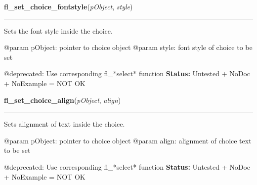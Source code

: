    \label{xformslib:deprecated:fl_set_choice_fontstyle}

    \vspace{0.5ex}

\hspace{.8\funcindent}\begin{boxedminipage}{\funcwidth}

    \raggedright \textbf{fl\_set\_choice\_fontstyle}(\textit{pObject}, \textit{style})

    \vspace{-1.5ex}

    \rule{\textwidth}{0.5\fboxrule}
\setlength{\parskip}{2ex}

Sets the font style inside the choice.

@param pObject: pointer to choice object
@param style: font style of choice to be set

@deprecated: Use corresponding fl\_*select* function
\setlength{\parskip}{1ex}
\textbf{Status:} 
Untested + NoDoc + NoExample = NOT OK


    \end{boxedminipage}

    \label{xformslib:deprecated:fl_set_choice_align}

    \vspace{0.5ex}

\hspace{.8\funcindent}\begin{boxedminipage}{\funcwidth}

    \raggedright \textbf{fl\_set\_choice\_align}(\textit{pObject}, \textit{align})

    \vspace{-1.5ex}

    \rule{\textwidth}{0.5\fboxrule}
\setlength{\parskip}{2ex}

Sets alignment of text inside the choice.

@param pObject: pointer to choice object
@param align: alignment of choice text to be set

@deprecated: Use corresponding fl\_*select* function
\setlength{\parskip}{1ex}
\textbf{Status:} 
Untested + NoDoc + NoExample = NOT OK


    \end{boxedminipage}

